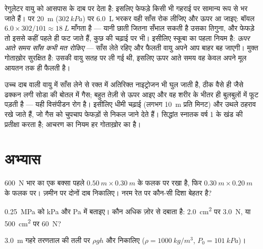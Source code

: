 \begin{remark}[साँस कभी मत रोकिए]\label{rem:g10:pressure:breath}
रेगुलेटर वायु को आसपास के दाब पर देता है: इसलिए फेफड़े किसी भी
गहराई पर सामान्य रूप से भर जाते हैं। पर \qty{20}{m} ($\qty{302}{kPa}$) पर \qty{6.0}{L}
भरकर वही साँस रोक लीजिए और ऊपर आ जाइए: बॉयल $6.0 \times 302/101 \approx \qty{18}{L}$ माँगता है --- यानी
छाती जितना सँभाल सकती है उसका तिगुना, और फेफड़े तो इससे कहीं पहले ही फट
जाते हैं, कुछ  की चढ़ाई पर भी। इसीलिए स्कूबा का पहला नियम
है: \emph{ऊपर आते समय साँस कभी मत रोकिए} --- साँस लेते रहिए और फैलती
वायु अपने आप बाहर बह जाएगी। मुक्त गोताख़ोर सुरक्षित है: उसकी वायु सतह
पर ली गई थी, इसलिए ऊपर आते समय वह केवल अपने मूल आयतन तक ही फैलती है।
\end{remark}

\begin{remark}[विसंपीडन]\label{rem:g10:pressure:deco}
उच्च दाब वाली वायु में साँस लेने से रक्त में अतिरिक्त
नाइट्रोजन भी घुल जाती है, ठीक वैसे ही जैसे ढक्कन लगी सोडा की बोतल में
गैस; बहुत तेज़ी से ऊपर आइए और वह शरीर के भीतर ही बुलबुलों में फूट पड़ती
है --- यही विसंपीडन रोग है। इसीलिए धीमी चढ़ाई (लगभग \qty{10}{m} प्रति मिनट)
और उथले ठहराव रखे जाते हैं, जो गैस को चुपचाप फेफड़ों से निकल जाने देते
हैं। सिद्धांत स्नातक वर्ष 1 के खंड की प्रतीक्षा करता है; आचरण का नियम
हर गोताख़ोर का है।
\end{remark}

\section{अभ्यास}

\begin{exercise}[$\star$]\label{exo:g10:pressure:1}
\qty{600}{N} भार का एक बक्सा पहले $\qty{0.50}{m} \times \qty{0.30}{m}$ के फलक पर रखा है, फिर $\qty{0.30}{m} \times \qty{0.20}{m}$ के
फलक पर। ज़मीन पर दोनों दाब निकालिए। नरम रेत पर कौन-सी दिशा
बेहतर है?
\end{exercise}

\begin{exercise}[$\star$]\label{exo:g10:pressure:2}
\qty{0.25}{MPa} को \unit{kPa} और \unit{Pa} में बताइए। कौन अधिक ज़ोर से दबाता है:
\qty{2.0}{cm^2} पर \qty{3.0}{N}, या \qty{500}{cm^2} पर \qty{60}{N}?
\end{exercise}

\begin{exercise}[$\star$]\label{exo:g10:pressure:3}
\qty{3.0}{m} गहरे तरणताल की तली पर  $\rho g h$ और
 निकालिए ($\rho = \qty{1000}{kg/m^3}$, $P_0 = \qty{101}{kPa}$)।
\end{exercise}

